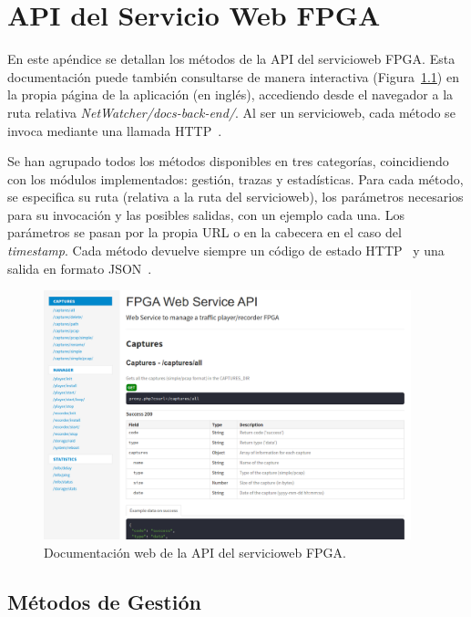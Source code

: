 \chapter{API del Servicio Web FPGA\label{extra:api_servicio_web_fpga}}

En este apéndice se detallan los métodos de la \gls{API} del \gls{servicioweb} \gls{FPGA}.
Esta documentación puede también consultarse de manera interactiva (Figura~\ref{fig:docsbackend}) en la propia página de la aplicación (en inglés), accediendo desde el navegador a la ruta relativa \textit{NetWatcher/docs-back-end/}.
Al ser un \gls{servicioweb}, cada método se invoca mediante una llamada \gls{HTTP}~\cite{httpmethods}.

Se han agrupado todos los métodos disponibles en tres categorías, coincidiendo con los módulos implementados: gestión, trazas y estadísticas.
Para cada método, se especifica su ruta (relativa a la ruta del \gls{servicioweb}), los parámetros necesarios para su invocación y las posibles salidas, con un ejemplo cada una.
Los parámetros se pasan por la propia \gls{URL} o en la cabecera en el caso del \textit{timestamp}.
Cada método devuelve siempre un código de estado \gls{HTTP}~\cite{httpcodes} y una salida en formato \gls{JSON}~\cite{json}.

\begin{figure}[!htp]
  \centering
  \includegraphics[width=0.95\textwidth,clip=true]{graphics/capturas/docs_backend}
  \caption{Documentación web de la \gls{API} del \gls{servicioweb} \gls{FPGA}.}
  \label{fig:docsbackend}
\end{figure}

\section{Métodos de Gestión \label{extra:api:gestion}}

